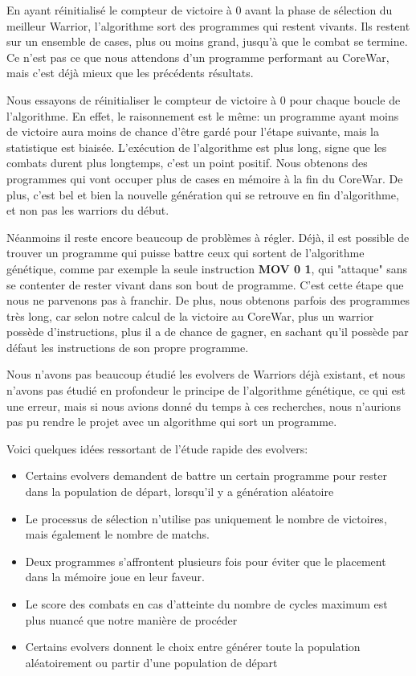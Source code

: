 \documentclass[hidelinks]{report}
\begin{document}
En ayant réinitialisé le compteur de victoire à 0 avant la phase de sélection du meilleur Warrior, l'algorithme sort des programmes qui restent vivants. Ils restent sur un ensemble de cases, plus ou moins grand, jusqu'à que le combat se termine. Ce n'est pas ce que nous attendons d'un programme performant au CoreWar, mais c'est déjà mieux que les précédents résultats.

Nous essayons de réinitialiser le compteur de victoire à 0 pour chaque boucle de l'algorithme. En effet, le raisonnement est le même: un programme ayant moins de victoire aura moins de chance d'être gardé pour l'étape suivante, mais la statistique est biaisée. L'exécution de l'algorithme est plus long, signe que les combats durent plus longtemps, c'est un point positif. Nous obtenons des programmes qui vont occuper plus de cases en mémoire à la fin du CoreWar. De plus, c'est bel et bien la nouvelle génération qui se retrouve en fin d'algorithme, et non pas les warriors du début.

Néanmoins il reste encore beaucoup de problèmes à régler. Déjà, il est possible de trouver un programme qui puisse battre ceux qui sortent de l'algorithme génétique, comme par exemple la seule instruction \textbf{MOV 0 1}, qui "attaque" sans se contenter de rester vivant dans son bout de programme. C'est cette étape que nous ne parvenons pas à franchir. De plus, nous obtenons parfois des programmes très long, car selon notre calcul de la victoire au CoreWar, plus un warrior possède d'instructions, plus il a de chance de gagner, en sachant qu'il possède par défaut les instructions de son propre programme.

Nous n'avons pas beaucoup étudié les evolvers de Warriors déjà existant, et nous n'avons pas étudié en profondeur le principe de l'algorithme génétique, ce qui est une erreur, mais si nous avions donné du temps à ces recherches, nous n'aurions pas pu rendre le projet avec un algorithme qui sort un programme.

Voici quelques idées ressortant de l'étude rapide des evolvers:
\begin{itemize}
    \item Certains evolvers demandent de battre un certain programme pour rester dans la population de départ, lorsqu'il y a génération aléatoire
    \item Le processus de sélection n'utilise pas uniquement le nombre de victoires, mais également le nombre de matchs.
    \item Deux programmes s'affrontent plusieurs fois pour éviter que le placement dans la mémoire joue en leur faveur.
    \item Le score des combats en cas d'atteinte du nombre de cycles maximum est plus nuancé que notre manière de procéder
    \item Certains evolvers donnent le choix entre générer toute la population aléatoirement ou partir d'une population de départ
\end{itemize}
\end{document}
